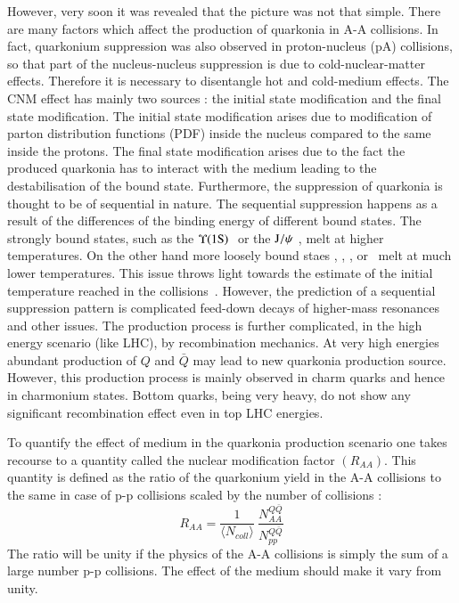 However, very soon it was revealed that the picture was not that simple. There are many factors which affect the 
production of quarkonia in A-A collisions. 
In fact, quarkonium suppression was also observed in proton-nucleus (pA)
collisions, so that part of the nucleus-nucleus suppression is due to 
cold-nuclear-matter effects. Therefore it is necessary to disentangle hot 
and cold-medium effects. The CNM effect has mainly two sources : the initial state modification and the 
final state modification. The initial state modification arises due to modification of parton distribution 
functions (PDF) inside the nucleus compared to the same inside the protons. The final state modification 
arises due to the  fact the produced quarkonia has to interact with the medium leading to the destabilisation
of the bound state. Furthermore, the suppression of quarkonia is thought to be of sequential in nature.  
The sequential suppression happens as a result of the differences of the  binding energy of different bound states. 
The strongly bound states, such as the $\Upsilon\mathrm{(1S)}\hspace {0.05in}$ or the $\mathrm{J}/\psi\hspace {0.05in}$,  melt at higher 
temperatures. On the other hand  more loosely bound staes \psiP, \chic, \chib, 
\upsb or \upsc \ melt at much lower temperatures.  This issue throws light towards the 
 estimate of the initial temperature reached in 
the collisions~\cite{Digal:2001ue}. However, the prediction of a sequential 
suppression pattern is complicated feed-down 
decays of higher-mass resonances and other issues. The production process is further 
complicated, in the high energy scenario (like LHC), by recombination mechanics. At very 
high energies abundant production of $Q$ and $\bar Q$ may lead to new quarkonia production 
source. However, this production process is mainly observed in charm quarks and hence in charmonium 
states. Bottom quarks, being very heavy, do not show any significant recombination effect even in top 
LHC energies.   

 To quantify the effect of medium in the quarkonia production scenario one takes recourse to a 
 quantity called the nuclear modification factor $(R_{AA})$. This quantity is defined as the ratio 
 of the quarkonium yield in the A-A collisions to the same in case of p-p collisions scaled by the 
 number of collisions : 
 \begin{equation}
 R_{AA} = \frac{1}{\langle N_{coll} \rangle} \ \frac {N^{Q{\bar Q}}_{AA}} {N^{Q{\bar Q}}_{pp}} 
 \end{equation}
 The ratio will be unity if the physics of the A-A collisions is simply the sum of a large number 
 p-p collisions. The effect of the medium should make it vary from unity. 

